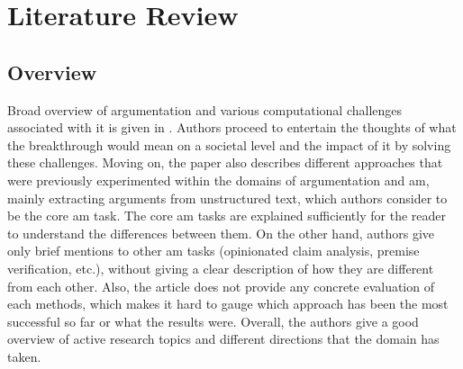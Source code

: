 \section{Literature Review}
    \subsection{Overview}
        Broad overview of argumentation and various computational challenges associated with it is given in \autocite{Lippi2016ArgumentationMS}. Authors proceed to entertain the thoughts of what the breakthrough would mean on a societal level and the impact of it by solving these challenges. Moving on, the paper also describes different approaches that were previously experimented within the domains of argumentation and \gls{am}, mainly extracting arguments from unstructured text, which authors consider to be the core \gls{am} task. The core \gls{am} tasks are explained sufficiently for the reader to understand the differences between them. On the other hand, authors give only brief mentions to other \gls{am} tasks (opinionated claim analysis, premise verification, etc.), without giving a clear description of how they are different from each other. Also, the article does not provide any concrete evaluation of each methods, which makes it hard to gauge which approach has been the most successful so far or what the results were. Overall, the authors give a good overview of active research topics and different directions that the domain has taken.
        

